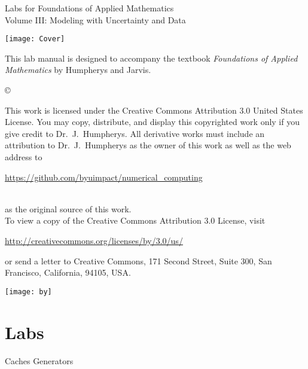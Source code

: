 \documentclass[nociteref]{SIAM-GH-book}
\begin{document}
\thispagestyle{empty}
\begin{center}
{\Large Labs for Foundations of Applied Mathematics} \\
\vspace{5mm}
{\Large Volume III: Modeling with Uncertainty and Data}
\vspace{5mm}

\texttt{[image: Cover]}
\end{center}
\frontmatter




\begin{thepreface}
This lab manual is designed to accompany the textbook \emph{Foundations of Applied Mathematics} by Humpherys and Jarvis.

\vfill
\copyright{This work is licensed under the Creative Commons Attribution 3.0 United States
License.  You may copy, distribute, and display this copyrighted work only if you give
credit to Dr.~J.~Humpherys. All derivative works must include an attribution to Dr.~J.~Humpherys as the owner of this work as well as the web address to
\\\centerline{\url{https://github.com/byuimpact/numerical_computing}}\\ as the original source of
this
work.\\To view a copy of the Creative Commons Attribution 3.0 License,
visit\\\centerline{\url{http://creativecommons.org/licenses/by/3.0/us/}} or send a letter to
Creative Commons, 171 Second Street, Suite 300, San Francisco, California, 94105, USA.}

\vfill
\centering\texttt{[image: by]}
\vfill
\end{thepreface}

\setcounter{tocdepth}{1}
\tableofcontents

\mainmatter

\part{Labs}
{Caches}
{Generators}
\end{document}
